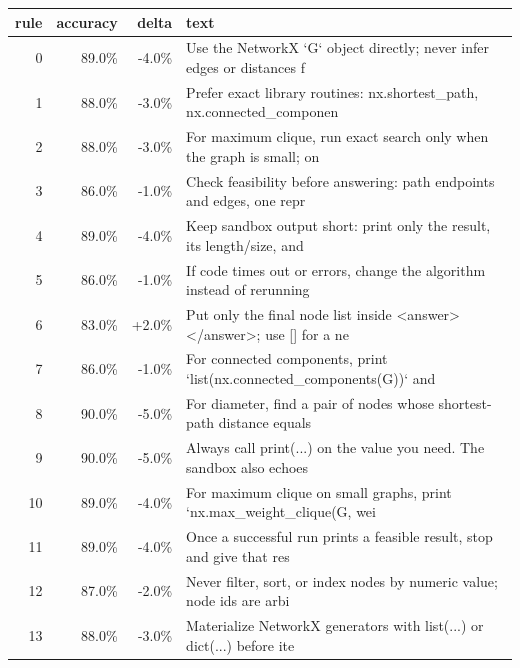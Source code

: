 \begin{tabular}{rrrp{7cm}}
\toprule
rule & accuracy & delta & text \\
\midrule
0 & 89.0\% & -4.0\% & Use the NetworkX `G` object directly; never infer edges or distances f \\
1 & 88.0\% & -3.0\% & Prefer exact library routines: nx.shortest\_path, nx.connected\_componen \\
2 & 88.0\% & -3.0\% & For maximum clique, run exact search only when the graph is small; on  \\
3 & 86.0\% & -1.0\% & Check feasibility before answering: path endpoints and edges, one repr \\
4 & 89.0\% & -4.0\% & Keep sandbox output short: print only the result, its length/size, and \\
5 & 86.0\% & -1.0\% & If code times out or errors, change the algorithm instead of rerunning \\
6 & 83.0\% & +2.0\% & Put only the final node list inside <answer></answer>; use [] for a ne \\
7 & 86.0\% & -1.0\% & For connected components, print `list(nx.connected\_components(G))` and \\
8 & 90.0\% & -5.0\% & For diameter, find a pair of nodes whose shortest-path distance equals \\
9 & 90.0\% & -5.0\% & Always call print(...) on the value you need. The sandbox also echoes  \\
10 & 89.0\% & -4.0\% & For maximum clique on small graphs, print `nx.max\_weight\_clique(G, wei \\
11 & 89.0\% & -4.0\% & Once a successful run prints a feasible result, stop and give that res \\
12 & 87.0\% & -2.0\% & Never filter, sort, or index nodes by numeric value; node ids are arbi \\
13 & 88.0\% & -3.0\% & Materialize NetworkX generators with list(...) or dict(...) before ite \\
\bottomrule
\end{tabular}

